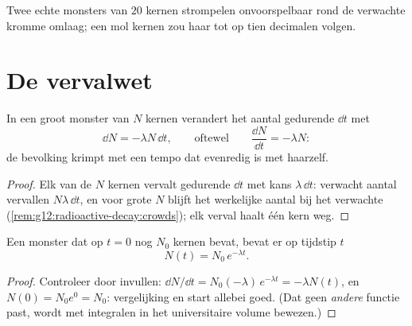 \begin{omfigure}

{\small Twee echte monsters van $20$ kernen strompelen onvoorspelbaar rond de
verwachte kromme omlaag; een mol kernen zou haar tot op tien decimalen
volgen.}
\end{omfigure}

\section{De vervalwet}

\begin{proposition}[De evolutievergelijking]\label{prop:g12:radioactive-decay:ode}
In een groot monster van $N$ kernen verandert het aantal gedurende $\dd t$ met
\[
\dd N = -\lambda N\,\dd t, \qquad\text{oftewel}\qquad \frac{\dd N}{\dd t} = -\lambda N :
\]
de bevolking krimpt met een tempo dat evenredig is met haarzelf.
\end{proposition}

\begin{proof}
Elk van de $N$ kernen vervalt gedurende $\dd t$ met kans $\lambda\,\dd t$:
verwacht aantal vervallen $N\lambda\,\dd t$, en voor grote $N$ blijft het
werkelijke aantal bij het verwachte
(\cref{rem:g12:radioactive-decay:crowds}); elk verval haalt één kern weg.
\end{proof}

\begin{theorem}\label{thm:g12:radioactive-decay:law}
Een monster dat op $t = 0$ nog $N_0$ kernen bevat, bevat er op tijdstip $t$
\[
N(t) = N_0 \, e^{-\lambda t}.
\]
\end{theorem}

\begin{proof}
Controleer door invullen:
$\dd N/\dd t = N_0(-\lambda)\,e^{-\lambda t} = -\lambda N(t)$, en
$N(0) = N_0 e^0 = N_0$: vergelijking en start allebei goed. (Dat geen
\emph{andere} functie past, wordt met integralen in het universitaire volume
bewezen.)
\end{proof}

